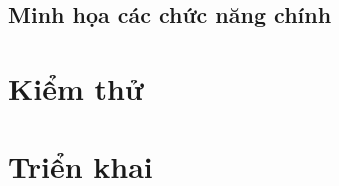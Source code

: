\BangAPI

\subsection*{Minh họa các chức năng chính}
\label{subsec:minhhoa}
\label{sec:caidat-frontend}

\section{Kiểm thử}
\label{sec:kiemthu}
\label{sec:pp-kiemthu}
\label{sec:kq-chucnang}

\BangTestHopDong

\BangTestAPI

\BangDoPhu

\BangGas

\section{Triển khai}
\label{sec:trienkhai}
\label{sec:kq-sepolia}

\HinhTrienKhai

